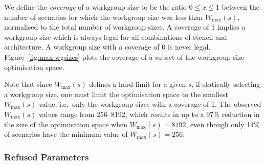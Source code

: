 We define the \emph{coverage} of a workgroup size to be the ratio
$0 \le x \le 1$ between the number of scenarios for which the
workgroup size was less than $W_{\max}(s)$, normalised to the total
number of workgroup sizes. A coverage of 1 implies a workgroup size
which is always legal for all combinations of stencil and
architecture. A workgroup size with a coverage of 0 is never
legal. Figure~\ref{fig:max-wgsizes} plots the coverage of a subset of
the workgroup size optimisation space.

Note that since $W_{\max}(s)$ defines a hard limit for a given $s$, if
statically selecting a workgroup size, one must limit the optimisation
space to the smallest $W_{\max}(s)$ value, i.e.\ only the workgroup
sizes with a coverage of 1. The observed $W_{\max}(s)$ values range
from 256--8192, which results in up to a 97\% reduction in the size of
the optimisation space when $W_{\max}(s) = 8192$, even though only
14\% of scenarios have the minimum value of $W_{\max}(s) = 256$.


\subsubsection{Refused Parameters}

\begin{table}
\parbox{.32\linewidth}{
  \centering
  \scriptsize
  
}
\hfill
\parbox{.32\linewidth}{
  \centering
  \scriptsize
  
}
\hfill
\parbox{.32\linewidth}{
  \centering
  \scriptsize
  
}
\caption[Workgroup sizes most frequently refused]{%
  The thirty most refused parameters, ranked in descending
  order. There is little correlation between the size of workgroup and the
  likelihood that it is refused, suggesting that the cause of refused
  parameters is not a resource constraint, but a behavioural issue.%
}
\label{tab:top-refused-params}
\end{table}

